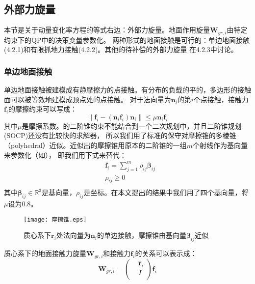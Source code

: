 \subsection{外部力旋量}
本节是关于动量变化率方程的等式右边：外部力旋量。地面作用旋量${\boldsymbol{W}}_{gr,i}$由特定约束下的QP中的决策变量参数化。
两种形式的地面接触是可行的：单边地面接触(4.2.1)和有限抓地力接触(4.2.2)。其他的待补偿的外部力旋量 在4.2.3中讨论。
\subsubsection{单边地面接触}
单边地面接触被建模成有静摩擦力的点接触。有分布的负载的平的，多边形的接触面可以被等效地建模成顶点处的点接触。
对于法向量为${{\boldsymbol{n}}_{i}}$的第$i$个点接触，接触力${{\boldsymbol{f}}_{i}}$的摩擦约束可以写成：
\begin{equation}
    \label{equ:friction_cone}
    \left\| {{\boldsymbol{f}}_{i}}-({{\boldsymbol{n}}_{i}}{{\boldsymbol{f}}_{i}}){{\boldsymbol{n}}_{i}} \right\|\le \mu {{\boldsymbol{n}}_{i}}{{\boldsymbol{f}}_{i}}
\end{equation}
其中$\mu$是摩擦系数。的二阶锥约束不能结合到一个二次规划中，并且二阶锥规划(SOCP)还没有比较快的求解器，
所以我们用了标准的保守对摩擦锥的多棱锥（polyhedral）近似。近似出的摩擦锥用原本的二阶锥的一组$m$个射线作为基向量来参数化（如），
即我们用下式来替代：
\begin{equation}
    \label{equ:friction_para}
    \begin{aligned}
        & {{\boldsymbol{f}}_{i}}=\sum\limits_{j=1}^{m}{{{\rho }_{ij}}{{\boldsymbol{\beta}}_{ij}}} \\ 
       & {{\rho }_{ij}}\ge 0 \\ 
      \end{aligned}      
\end{equation}
其中$\boldsymbol{\beta}_{ij} \in \mathbb{R}^3$是基向量，$\rho_{ij}$是坐标。在本文提出的结果中我们用了四个基向量，将$\mu$设为0.8。
\begin{figure}[htbp]
    \centering
    \texttt{[image: 摩擦锥.eps]}
    \caption{\label{fig:friction_cone}质心系下$\boldsymbol{r}_{i}$处法向量为${{\boldsymbol{n}}_{i}}$的单边接触，摩擦锥由基向量$\boldsymbol{\beta}_{ij}$近似}
\end{figure}
质心系下的地面接触力旋量${{\boldsymbol{W}}_{gr,i}}$和接触力${{\boldsymbol{f}}_{i}}$的关系可以表示成：
\begin{equation}
    \label{equ:contact_wrench}
    {\boldsymbol{W}_{gr,i}}=\left( \begin{aligned}
        & {{{\hat{\boldsymbol{r}}}}_{i}} \\ 
       & I \\ 
      \end{aligned} \right){\boldsymbol{f}_{i}}      
\end{equation}
